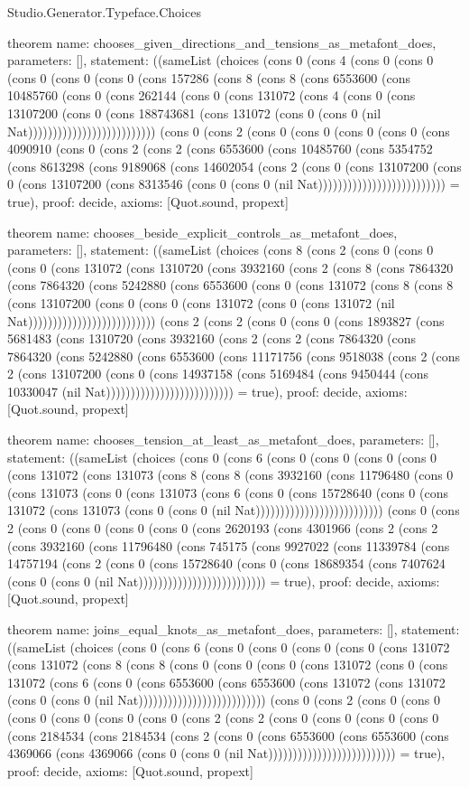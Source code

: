 \begin{lexlean}{Studio.Generator.Typeface.Choices}
\begin{semanticmodule}
theorem{
  name: chooses_given_directions_and_tensions_as_metafont_does,
  parameters: [],
  statement: ((sameList (choices (cons 0 (cons 4 (cons 0 (cons 0 (cons 0 (cons 0 (cons 0 (cons 157286 (cons 8 (cons 8 (cons 6553600 (cons 10485760 (cons 0 (cons 262144 (cons 0 (cons 131072 (cons 4 (cons 0 (cons 13107200 (cons 0 (cons 188743681 (cons 131072 (cons 0 (cons 0 (nil Nat)))))))))))))))))))))))))) (cons 0 (cons 2 (cons 0 (cons 0 (cons 0 (cons 0 (cons 4090910 (cons 0 (cons 2 (cons 2 (cons 6553600 (cons 10485760 (cons 5354752 (cons 8613298 (cons 9189068 (cons 14602054 (cons 2 (cons 0 (cons 13107200 (cons 0 (cons 13107200 (cons 8313546 (cons 0 (cons 0 (nil Nat)))))))))))))))))))))))))) = true),
  proof: decide{},
  axioms: [Quot.sound, propext]
}

theorem{
  name: chooses_beside_explicit_controls_as_metafont_does,
  parameters: [],
  statement: ((sameList (choices (cons 8 (cons 2 (cons 0 (cons 0 (cons 0 (cons 131072 (cons 1310720 (cons 3932160 (cons 2 (cons 8 (cons 7864320 (cons 7864320 (cons 5242880 (cons 6553600 (cons 0 (cons 131072 (cons 8 (cons 8 (cons 13107200 (cons 0 (cons 0 (cons 131072 (cons 0 (cons 131072 (nil Nat)))))))))))))))))))))))))) (cons 2 (cons 2 (cons 0 (cons 0 (cons 1893827 (cons 5681483 (cons 1310720 (cons 3932160 (cons 2 (cons 2 (cons 7864320 (cons 7864320 (cons 5242880 (cons 6553600 (cons 11171756 (cons 9518038 (cons 2 (cons 2 (cons 13107200 (cons 0 (cons 14937158 (cons 5169484 (cons 9450444 (cons 10330047 (nil Nat)))))))))))))))))))))))))) = true),
  proof: decide{},
  axioms: [Quot.sound, propext]
}

theorem{
  name: chooses_tension_at_least_as_metafont_does,
  parameters: [],
  statement: ((sameList (choices (cons 0 (cons 6 (cons 0 (cons 0 (cons 0 (cons 0 (cons 131072 (cons 131073 (cons 8 (cons 8 (cons 3932160 (cons 11796480 (cons 0 (cons 131073 (cons 0 (cons 131073 (cons 6 (cons 0 (cons 15728640 (cons 0 (cons 131072 (cons 131073 (cons 0 (cons 0 (nil Nat)))))))))))))))))))))))))) (cons 0 (cons 2 (cons 0 (cons 0 (cons 0 (cons 0 (cons 2620193 (cons 4301966 (cons 2 (cons 2 (cons 3932160 (cons 11796480 (cons 745175 (cons 9927022 (cons 11339784 (cons 14757194 (cons 2 (cons 0 (cons 15728640 (cons 0 (cons 18689354 (cons 7407624 (cons 0 (cons 0 (nil Nat)))))))))))))))))))))))))) = true),
  proof: decide{},
  axioms: [Quot.sound, propext]
}

theorem{
  name: joins_equal_knots_as_metafont_does,
  parameters: [],
  statement: ((sameList (choices (cons 0 (cons 6 (cons 0 (cons 0 (cons 0 (cons 0 (cons 131072 (cons 131072 (cons 8 (cons 8 (cons 0 (cons 0 (cons 0 (cons 131072 (cons 0 (cons 131072 (cons 6 (cons 0 (cons 6553600 (cons 6553600 (cons 131072 (cons 131072 (cons 0 (cons 0 (nil Nat)))))))))))))))))))))))))) (cons 0 (cons 2 (cons 0 (cons 0 (cons 0 (cons 0 (cons 0 (cons 0 (cons 2 (cons 2 (cons 0 (cons 0 (cons 0 (cons 0 (cons 2184534 (cons 2184534 (cons 2 (cons 0 (cons 6553600 (cons 6553600 (cons 4369066 (cons 4369066 (cons 0 (cons 0 (nil Nat)))))))))))))))))))))))))) = true),
  proof: decide{},
  axioms: [Quot.sound, propext]
}


\end{semanticmodule}
\end{lexlean}
